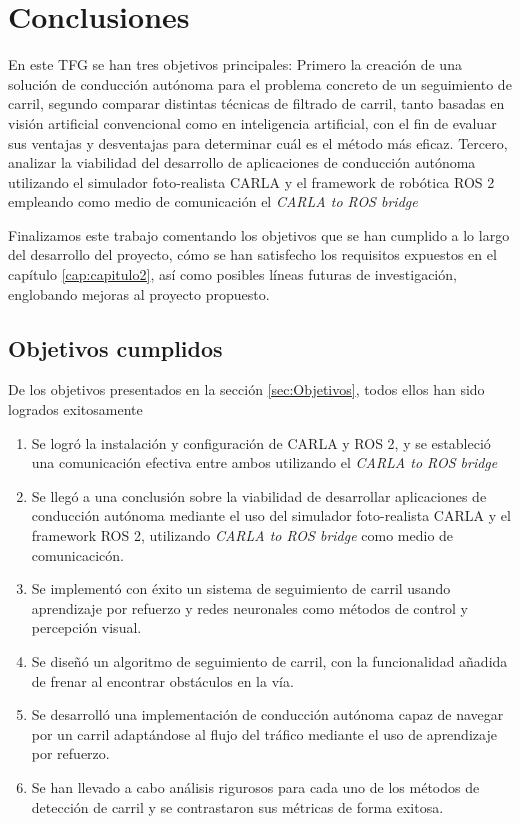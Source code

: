 \chapter{Conclusiones}
\label{cap:capitulo5}

En este \acs{TFG} se han tres objetivos principales: Primero la creación de una solución de conducción autónoma para el problema concreto de un seguimiento de carril, segundo comparar distintas técnicas de filtrado de carril, tanto basadas en visión artificial convencional como en inteligencia artificial, con el fin de evaluar sus ventajas y desventajas para determinar cuál es el método más eficaz. Tercero, analizar la viabilidad del desarrollo de aplicaciones de conducción autónoma utilizando el simulador foto-realista CARLA y el framework de robótica ROS 2 empleando como medio de comunicación el \textit{CARLA to ROS bridge}

Finalizamos este trabajo comentando los objetivos que se han cumplido a lo largo del desarrollo del proyecto, cómo se han satisfecho los requisitos expuestos en el capítulo \ref{cap:capitulo2}, así como posibles líneas futuras de investigación, englobando mejoras al proyecto propuesto.

\section{Objetivos cumplidos}
\label{sec:objetivos_cumplidos}

De los objetivos presentados en la sección \ref{sec:Objetivos}, todos ellos han sido logrados exitosamente
\begin{enumerate}
	\item Se  logró la instalación y configuración de CARLA y ROS 2, y se estableció una comunicación efectiva entre ambos utilizando el  \textit{CARLA to ROS bridge}
	
	\item Se llegó a una conclusión sobre la viabilidad de desarrollar aplicaciones de conducción autónoma mediante el uso del simulador foto-realista CARLA y el framework ROS 2, utilizando  \textit{CARLA to ROS bridge}  como medio de comunicacicón.
	
	\item Se implementó con éxito un sistema de seguimiento de carril usando aprendizaje por refuerzo y redes neuronales como métodos de control y percepción visual.
	
	\item Se diseñó un algoritmo de seguimiento de carril, con la funcionalidad añadida de frenar al encontrar obstáculos en la vía.
	
	\item Se desarrolló una implementación de conducción autónoma capaz de navegar por un carril adaptándose al flujo del tráfico mediante el uso de aprendizaje por refuerzo.
	
	\item Se han llevado a cabo análisis rigurosos para cada uno de los métodos de detección de carril y se contrastaron sus métricas de forma exitosa.
	
\end{enumerate}


